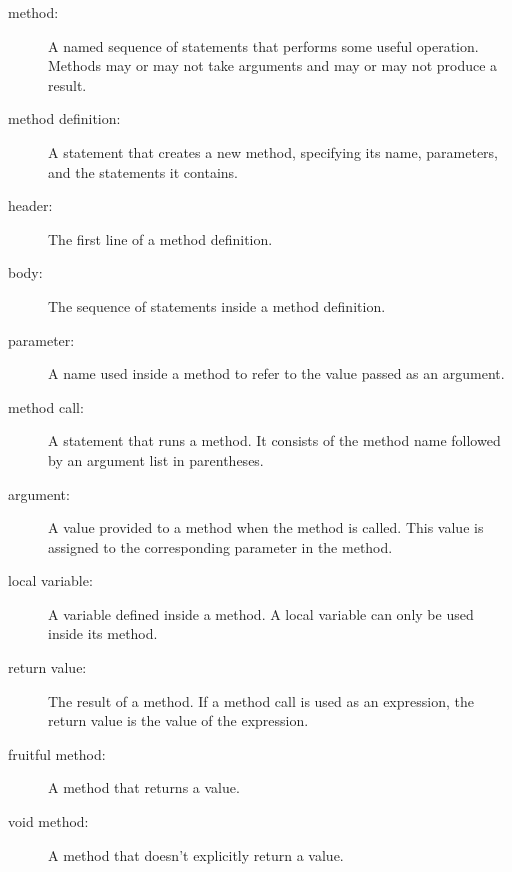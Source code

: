 \documentclass[10pt]{book}
\begin{document}
\begin{description}

\item[method:] A named sequence of statements that performs some
useful operation.  Methods may or may not take arguments and may or
may not produce a result.

\item[method definition:]  A statement that creates a new method,
specifying its name, parameters, and the statements it contains.


\item[header:] The first line of a method definition.

\item[body:] The sequence of statements inside a method definition.

\item[parameter:] A name used inside a method to refer to the value
passed as an argument.

\item[method call:] A statement that runs a method.  It
consists of the method name followed by an argument list in
parentheses.

\item[argument:]  A value provided to a method when the method is called.
This value is assigned to the corresponding parameter in the method.

\item[local variable:]  A variable defined inside a method.  A local
variable can only be used inside its method.

\item[return value:]  The result of a method.  If a method call
is used as an expression, the return value is the value of
the expression.

\item[fruitful method:] A method that returns a value.

\item[void method:] A method that doesn't explicitly return a value.


\end{description}
\end{document}
